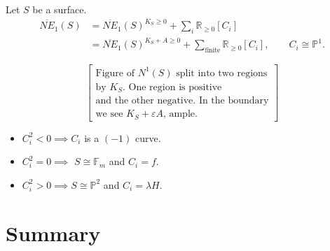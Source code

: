 \begin{theorem}
\label{theorem-mori-cone}
Let $S$ be a surface.
$$
\begin{aligned}
\overline{NE}_1(S)&=\overline{NE}_1(S)^{K_S
\geq 0}
+\sum_i\mathbb{R}_{\geq 0}[C_i]\\
&=\overline{NE}_1(S)^{K_S+A \geq 0}
+ \sum_{\text{finite}}\mathbb{R}_{\geq
0}[C_i], \qquad C_i\cong
\mathbb{P}^1.
\end{aligned}
$$
\end{theorem}

$$
\left[
\substack{\text{
Figure of $N^1(S)$ split into two regions} \\
\text{by $K_S$. One region is positive}\\
\text{and the other negative. In the
boundary}\\
\text{we see $K_S + \varepsilon A$, ample.}}
\right]
$$

\begin{theorem}
\label{theorem-classification}
\begin{itemize}
\item $C_i^2<0 \implies C_i$ is a $(-1)$
curve.
\item $C_i^2 = 0 \implies $ $S \cong
\mathbb{F}_m$ and $C_i=f$.
\item  $C_i^2 >0 \implies S \cong
\mathbb{P}^2$ and $C_i=\lambda H$.
\end{itemize}
\end{theorem}



\section{Summary }
\label{section-summary-duplicate-2}


